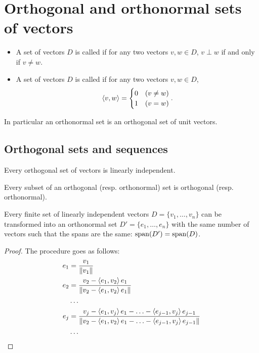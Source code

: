 \section{Orthogonal and orthonormal sets of vectors}
\begin{definition}
\begin{itemize}
\item A set of vectors $D$ is called  if for any two vectors $v,w\in D$, $v\perp w$ \textup{if and only if} $v\neq w$.
\item A set of vectors $D$ is called  if for any two vectors $v,w\in D$,
\[ \left\langle v,w \right\rangle = \begin{cases}
0 & (v\neq w) \\ 1 & (v=w)
\end{cases}. \]
\end{itemize}
In particular an orthonormal set is an orthogonal set of unit vectors.
\end{definition}

\subsection{Orthogonal sets and sequences}
\begin{lemma} \label{lemma:orthogonalLinearlyIndependent}
Every orthogonal set of vectors is linearly independent.
\end{lemma}
\begin{lemma}
Every subset of an orthogonal (resp. orthonormal) set is orthogonal (resp. orthonormal).
\end{lemma}

\begin{theorem}
Every finite set of linearly independent vectors $D = \{v_1,\ldots, v_n\}$ can be transformed into an orthonormal set $D' = \{e_1,\ldots,e_n\}$ with the same number of vectors such that the spans are the same: $\operatorname{span}(D') = \operatorname{span}(D)$.
\end{theorem}
\begin{proof}
The procedure goes as follows:
\begin{align*}
e_1 &= \frac{v_1}{\lVert v_1\rVert} \\
e_2 &= \frac{v_2 - \left\langle e_1,v_2 \right\rangle e_1}{\lVert v_2 - \left\langle e_1,v_2 \right\rangle e_1\rVert} \\
&\hdots \\
e_j &= \frac{v_j - \left\langle e_1,v_j \right\rangle e_1- \ldots - \left\langle e_{j-1},v_j \right\rangle e_{j-1}}{\lVert v_2 - \left\langle e_1,v_2 \right\rangle e_1- \ldots - \left\langle e_{j-1},v_j \right\rangle e_{j-1}\rVert} \\
&\hdots
\end{align*}
\end{proof}

